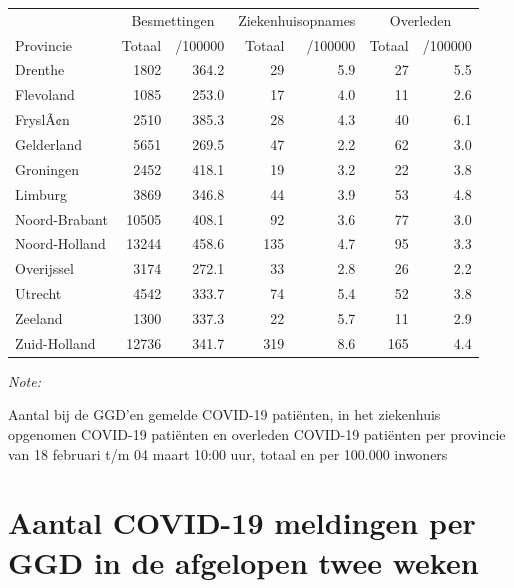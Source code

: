 \documentclass[
  english,
  man,floatsintext]{apa6}
\begin{document}
\begin{table}
\centering
\begin{threeparttable}
\begin{tabular}{lrrrrrr}
\toprule
\multicolumn{1}{c}{ } & \multicolumn{2}{c}{Besmettingen} & \multicolumn{2}{c}{Ziekenhuisopnames} & \multicolumn{2}{c}{Overleden} \\
\cmidrule(l{3pt}r{3pt}){2-3} \cmidrule(l{3pt}r{3pt}){4-5} \cmidrule(l{3pt}r{3pt}){6-7}
Provincie & Totaal & /100000 & Totaal & /100000 & Totaal & /100000\\
\midrule
Drenthe & 1802 & 364.2 & 29 & 5.9 & 27 & 5.5\\
Flevoland & 1085 & 253.0 & 17 & 4.0 & 11 & 2.6\\
FryslÃ¢n & 2510 & 385.3 & 28 & 4.3 & 40 & 6.1\\
Gelderland & 5651 & 269.5 & 47 & 2.2 & 62 & 3.0\\
Groningen & 2452 & 418.1 & 19 & 3.2 & 22 & 3.8\\
Limburg & 3869 & 346.8 & 44 & 3.9 & 53 & 4.8\\
Noord-Brabant & 10505 & 408.1 & 92 & 3.6 & 77 & 3.0\\
Noord-Holland & 13244 & 458.6 & 135 & 4.7 & 95 & 3.3\\
Overijssel & 3174 & 272.1 & 33 & 2.8 & 26 & 2.2\\
Utrecht & 4542 & 333.7 & 74 & 5.4 & 52 & 3.8\\
Zeeland & 1300 & 337.3 & 22 & 5.7 & 11 & 2.9\\
Zuid-Holland & 12736 & 341.7 & 319 & 8.6 & 165 & 4.4\\
\bottomrule
\end{tabular}
\begin{tablenotes}
\item \textit{Note: } 
\item Aantal bij de GGD’en gemelde COVID-19 patiënten, in het ziekenhuis opgenomen COVID-19 patiënten en overleden COVID-19 patiënten per provincie van 18 februari t/m 04 maart 10:00 uur, totaal en per 100.000 inwoners
\end{tablenotes}
\end{threeparttable}
\end{table}

\newpage

\hypertarget{aantal-covid-19-meldingen-per-ggd-in-de-afgelopen-twee-weken}{%
\section{Aantal COVID-19 meldingen per GGD in de afgelopen twee weken}\label{aantal-covid-19-meldingen-per-ggd-in-de-afgelopen-twee-weken}}
\end{document}
